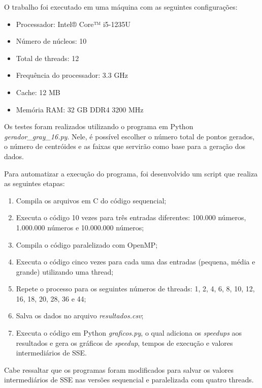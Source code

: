 O trabalho foi executado em uma máquina com as seguintes configurações:
\begin{itemize}
\item Processador: Intel® Core™ i5-1235U
\item Número de núcleos: 10
\item Total de threads: 12
\item Frequência do processador: 3.3 GHz
\item Cache: 12 MB
\item Memória RAM: 32 GB DDR4 3200 MHz
\end{itemize}

\par Os testes foram realizados utilizando o programa em Python \textit{gerador\_gray\_16.py}. Nele, é possível escolher o número total de pontos gerados, o número de centróides e as faixas que servirão como base para a geração dos dados.

\par Para automatizar a execução do programa, foi desenvolvido um script que realiza as seguintes etapas:
\begin{enumerate}
\item Compila os arquivos em C do código sequencial;
\item Executa o código 10 vezes para três entradas diferentes: 100.000 números, 1.000.000 números e 10.000.000 números;
\item Compila o código paralelizado com OpenMP;
\item Executa o código cinco vezes para cada uma das entradas (pequena, média e grande) utilizando uma thread;
\item Repete o processo para os seguintes números de threads: 1, 2, 4, 6, 8, 10, 12, 16, 18, 20, 28, 36 e 44;
\item Salva os dados no arquivo \textit{resultados.csv};
\item Executa o código em Python \textit{graficos.py}, o qual adiciona os \textit{speedups} aos resultados e gera os gráficos de \textit{speedup}, tempos de execução e valores intermediários de SSE.
\end{enumerate}

\par Cabe ressaltar que os programas foram modificados para salvar os valores intermediários de SSE nas versões sequencial e paralelizada com quatro threads.
